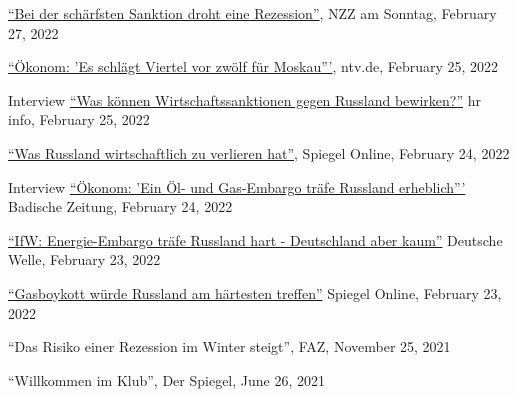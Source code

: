 \documentclass{article}
\begin{document}
\begin{minipage}[t]{0.8\textwidth}
    \href{https://magazin.nzz.ch/nzz-am-sonntag/international/bei-der-schaerfsten-sanktion-droht-eine-rezession-ld.1671972?reduced=true}{``Bei der schärfsten Sanktion droht eine Rezession''}, NZZ am Sonntag, February 27, 2022 \par
    \href{https://www.n-tv.de/wirtschaft/Okonom-Es-schlaegt-Viertel-vor-zwoelf-fuer-Moskau-article23155253.html}{``Ökonom: 'Es schlägt Viertel vor zwölf für Moskau'''}, ntv.de, February 25, 2022 \par
    Interview \href{https://www.hr-inforadio.de/programm/themen/ukraine-krieg-was-koennen-wirtschaftssanktionen-gegen-russland-bewirken,ukraine-konflikt-was-koennen-sanktionen-bewirken-100.html}{``Was können Wirtschaftssanktionen gegen Russland bewirken?''} hr info, February 25, 2022 \par
    \href{https://www.spiegel.de/wirtschaft/russland-und-die-eu-was-russland-wirtschaftlich-zu-verlieren-hat-a-09eb6357-9607-45f8-bfb8-d39ef5e71b86}{``Was Russland wirtschaftlich zu verlieren hat''}, Spiegel Online, February 24, 2022 \par
    Interview \href{https://www.badische-zeitung.de/die-russland-sanktionen-sind-noch-nicht-die-ganz-grosse-keule--209731804.html}{``Ökonom: 'Ein Öl- und Gas-Embargo träfe Russland erheblich'''} Badische Zeitung, February 24, 2022 \par
    \href{https://www.dw.com/de/ifw-energie-embargo-tr\%C3\%A4fe-russland-hart-deutschland-aber-kaum/a-60885585}{``IfW: Energie-Embargo träfe Russland hart - Deutschland aber kaum''} Deutsche Welle, February 23, 2022 \par
    \href{https://www.spiegel.de/wirtschaft/unternehmen/sanktionen-wegen-ukraine-eskalation-gas-boykott-wuerde-russland-am-haertesten-treffen-a-d28dc387-1c8b-498d-9470-ef15043fac74}{``Gasboykott würde Russland am härtesten treffen''} Spiegel Online, February 23, 2022 \par
    ``Das Risiko einer Rezession im Winter steigt'', FAZ, November 25, 2021 \par
    ``Willkommen im Klub'', Der Spiegel, June 26, 2021 \par
\end{minipage}
\medskip

\end{document}
